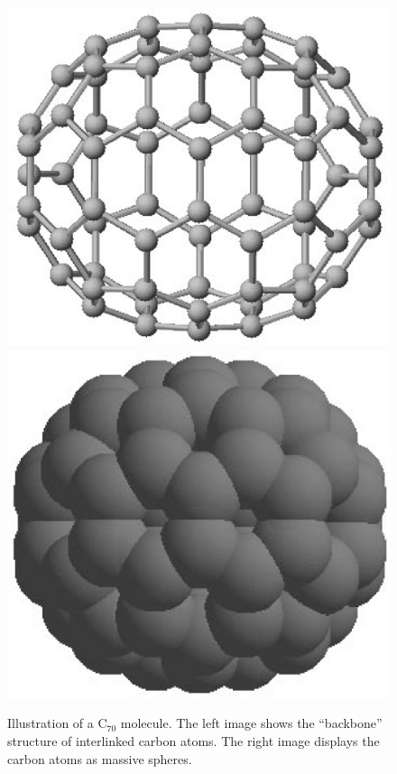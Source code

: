 \documentclass[twocolumn,aps,floatfix,amsmath,amssymb,showpacs,nofootinbib]{revtex4}
\begin{document}
\begin{figure}
\begin{center}
\includegraphics[scale=.21]{c70-n.eps} 
\includegraphics[scale=.20]{c70-full-n.eps}
\end{center}
\caption[Illustration of a C$_{70}$ molecule]{\label{fig:c70}
  Illustration of a C$_{70}$ molecule. The left image shows the
  ``backbone'' structure of interlinked carbon atoms. The right image
  displays the carbon atoms as massive spheres. }
\end{figure}
\end{document}
